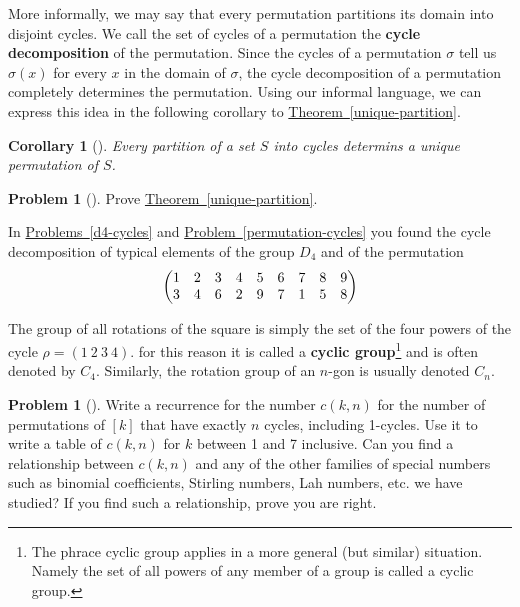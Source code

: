 \documentclass[10pt,]{book}
\newcommand{\terminology}[1]{\textbf{#1}}
\theoremstyle{plain}
\newtheorem{corollary}[theorem]{Corollary}
\theoremstyle{definition}
\newtheorem{activity}[project]{Problem}
\theoremstyle{definition}
\numberwithin{equation}{chapter}
\newcommand{\importantarrow}{\Rightarrow}
\newcommand{\amp}{&}
\begin{document}
More informally, we may say that every permutation partitions its domain into disjoint cycles. We call the set of cycles of a permutation the \terminology{cycle decomposition} of the permutation. Since the cycles of a permutation \(\sigma\) tell us \(\sigma(x)\) for every \(x\) in the domain of \(\sigma\), the cycle decomposition of a permutation completely determines the permutation. Using our informal language, we can express this idea in the following corollary to \hyperref[unique-partition]{Theorem~\ref{unique-partition}}.%
\begin{corollary}[{}]\label{corollary-2}
Every partition of a set \(S\) into cycles determins a unique permutation of \(S\).%
\end{corollary}
\begin{activity}[]\marginsymbol[-1em]{} \label{activity-276}
Prove \hyperref[unique-partition]{Theorem~\ref{unique-partition}}.%
\end{activity}
In \hyperref[d4-cycles]{Problems~\ref{d4-cycles}} and \hyperref[permutation-cycles]{Problem~\ref{permutation-cycles}} you found the cycle decomposition of typical elements of the group \(D_4\) and of the permutation%
\begin{equation*}
\begin{pmatrix}1\amp 2\amp 3\amp 4\amp 5\amp 6\amp 7\amp 8\amp 9\cr
3\amp 4\amp 6\amp 2\amp 9\amp 7\amp 1\amp 5\amp 8
\end{pmatrix}
\end{equation*}
%
\par
The group of all rotations of the square is simply the set of the four powers of the cycle \(\rho = (1\ 2\ 3\ 4)\).  for this reason it is called a \terminology{cyclic group}\footnote{The phrace cyclic group applies in a more general (but similar) situation.  Namely the set of all powers of any member of a group is called a cyclic group.\label{fn-21}} and is often denoted by \(C_4\).  Similarly, the rotation group of an \(n\)-gon is usually denoted \(C_n\).%
\begin{activity}[]\marginsymbol[-1em]{\pdftooltip{$\importantarrow$}{especially interesting}} \label{activity-277}
Write a recurrence for the number \(c(k,n)\) for the number of permutations of \([k]\) that have exactly \(n\) cycles, including 1-cycles. Use it to write a table of \(c(k,n)\) for \(k\) between 1 and 7 inclusive. Can you find a relationship between \(c(k,n)\) and any of the other families of special numbers such as binomial coefficients, Stirling numbers, Lah numbers, etc. we have studied? If you find such a relationship, prove you are right.%
\end{activity}
\end{document}

